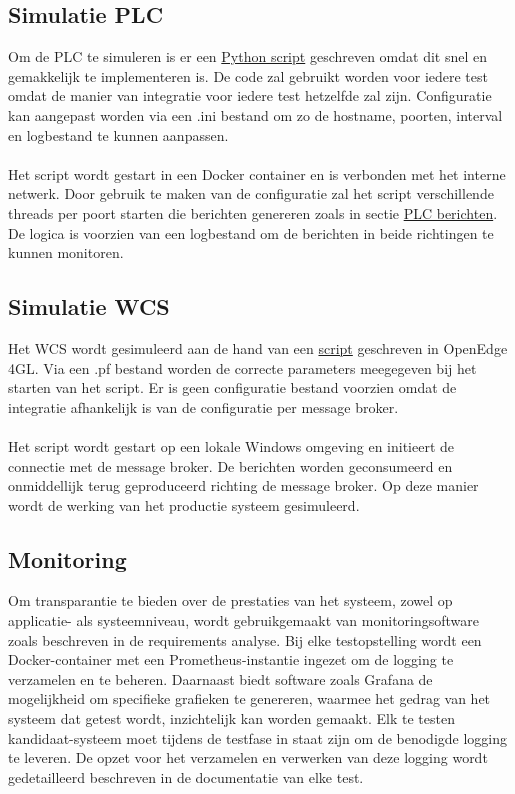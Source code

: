 \subsection{Simulatie PLC}
Om de PLC te simuleren is er een \hyperref[listing:code_plc]{Python script} geschreven omdat dit snel en gemakkelijk te implementeren is.
De code zal gebruikt worden voor iedere test omdat de manier van integratie voor iedere test hetzelfde zal zijn.
Configuratie kan aangepast worden via een .ini bestand om zo de hostname, poorten, interval en logbestand te kunnen aanpassen.
\\\\
Het script wordt gestart in een Docker container en is verbonden met het interne netwerk.
Door gebruik te maken van de configuratie zal het script verschillende threads per poort starten die berichten genereren
zoals in sectie \hyperref[listing:message_example]{PLC berichten}.
De logica is voorzien van een logbestand om de berichten in beide richtingen te kunnen monitoren.

\subsection{Simulatie WCS}
Het WCS wordt gesimuleerd aan de hand van een \hyperref[listing:code_wcs]{script} geschreven in OpenEdge 4GL.
Via een .pf bestand worden de correcte parameters meegegeven bij het starten van het script.
Er is geen configuratie bestand voorzien omdat de integratie afhankelijk is van de configuratie per message broker.
\\\\
Het script wordt gestart op een lokale Windows omgeving en initieert de connectie met de message broker.
De berichten worden geconsumeerd en onmiddellijk terug geproduceerd richting de message broker.
Op deze manier wordt de werking van het productie systeem gesimuleerd.

\subsection{Monitoring}
Om transparantie te bieden over de prestaties van het systeem, zowel op applicatie- als systeemniveau, 
wordt gebruikgemaakt van monitoringsoftware zoals beschreven in de requirements analyse.
Bij elke testopstelling wordt een Docker-container met een Prometheus-instantie ingezet om de logging te verzamelen en te beheren.
Daarnaast biedt software zoals Grafana de mogelijkheid om specifieke grafieken te genereren, 
waarmee het gedrag van het systeem dat getest wordt, inzichtelijk kan worden gemaakt.
Elk te testen kandidaat-systeem moet tijdens de testfase in staat zijn om de benodigde logging te leveren. 
De opzet voor het verzamelen en verwerken van deze logging wordt gedetailleerd beschreven in de documentatie van elke test.
\newpage

